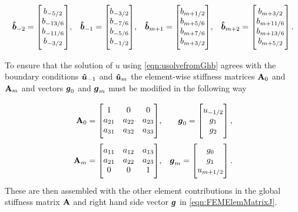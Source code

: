 \begin{align*}
\vecn{\hat{b}}_{-2} = \begin{bmatrix} \TM
b_{-5/2} \\ b_{-13/6} \\ b_{-11/6} \\ b_{-3/2} \BM\end{bmatrix}&, &\vecn{\hat{b}}_{-1} = \begin{bmatrix} \TM
b_{-3/2} \\ b_{-7/6} \\ b_{-5/6} \\ b_{-1/2} \BM\end{bmatrix}&, &\vecn{\hat{b}}_{m+1} = \begin{bmatrix} \TM
b_{m+1/2} \\ b_{m+5/6} \\ b_{m+7/6} \\ b_{m+3/2} \BM\end{bmatrix}&, &\vecn{\hat{b}}_{m+2} = \begin{bmatrix} \TM
b_{m+3/2} \\ b_{m+11/6} \\ b_{m+13/6} \\ b_{m+5/2} \BM\end{bmatrix}.
\end{align*}

To ensure that the solution of $u$ using \eqref{eqn:usolvefromGhb} agrees with the boundary conditions $\boldsymbol{\hat{u}}_{-1}$ and $\boldsymbol{\hat{u}}_{m}$ the element-wise stiffness matrices $\mathbf{A}_0$ and $\mathbf{A}_m$ and vectors $\boldsymbol{g}_0$ and $\boldsymbol{g}_m$ must be modified in the following way 

\begin{align*}
\matr{A}_{0} = 
\begin{bmatrix}
\TM 1 &0 &0 \\
a_{21} & a_{22} & a_{23} \\
a_{31} & a_{32} & a_{33} \BM
\end{bmatrix} &,& \vecn{g}_{0} = \begin{bmatrix}
\TM u_{-1/2} \\
g_1 \\
g_2 \BM
\end{bmatrix},\\
\matr{A}_{m} = 
\begin{bmatrix}
\TM a_{11} & a_{12} & a_{13} \\
a_{21} & a_{22} & a_{23} \\
0 & 0 & 1 \BM
\end{bmatrix} &,& \vecn{g}_{m} = \begin{bmatrix}
\TM g_0\\ 
g_1 \\
u_{m+1/2} \BM
\end{bmatrix}.
\end{align*}
These are then assembled with the other element contributions in the global stiffness matrix $\mathbf{A}$ and right hand side vector $\boldsymbol{g}$ in \eqref{eqn:FEMElemMatrixJ}.

